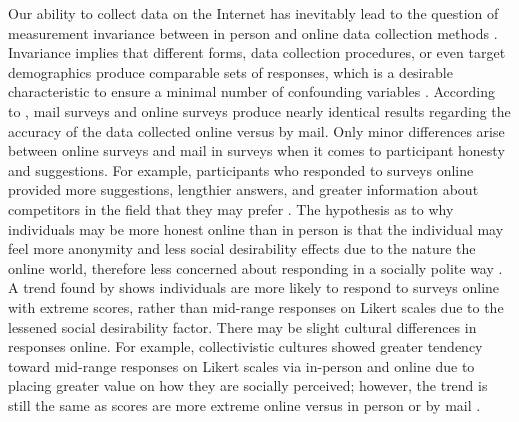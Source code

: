 \documentclass[english,man, mask]{apa6}
\theoremstyle{definition}
\theoremstyle{definition}
\theoremstyle{definition}
\theoremstyle{remark}
\begin{document}
Our ability to collect data on the Internet has inevitably lead to the
question of measurement invariance between in person and online data
collection methods \autocites{Meyerson2003}{Buchanan2005}. Invariance
implies that different forms, data collection procedures, or even target
demographics produce comparable sets of responses, which is a desirable
characteristic to ensure a minimal number of confounding variables
\autocite{Brown2006}. According to \textcite{Deutskens2006}, mail
surveys and online surveys produce nearly identical results regarding
the accuracy of the data collected online versus by mail. Only minor
differences arise between online surveys and mail in surveys when it
comes to participant honesty and suggestions. For example, participants
who responded to surveys online provided more suggestions, lengthier
answers, and greater information about competitors in the field that
they may prefer \autocite{Deutskens2006}. The hypothesis as to why
individuals may be more honest online than in person is that the
individual may feel more anonymity and less social desirability effects
due to the nature the online world, therefore less concerned about
responding in a socially polite way \autocite{Joinson1999}. A trend
found by \textcite{Fang2012a} shows individuals are more likely to
respond to surveys online with extreme scores, rather than mid-range
responses on Likert scales due to the lessened social desirability
factor. There may be slight cultural differences in responses online.
For example, collectivistic cultures showed greater tendency toward
mid-range responses on Likert scales via in-person and online due to
placing greater value on how they are socially perceived; however, the
trend is still the same as scores are more extreme online versus in
person or by mail \autocite{Fang2012}.
\end{document}
